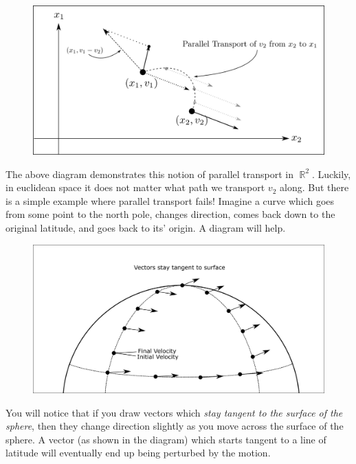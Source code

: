 \documentclass{article}
\DeclareMathOperator{\RR}{\mathbb{R}}
\begin{document}
\begin{figure}[ht]
    \centering
    \includegraphics[width=\linewidth]{Figures/figure3.png}
    \caption*{}
    \label{fig:21}
\end{figure}
The above diagram demonstrates this notion of parallel transport in $\RR^2$. Luckily, in euclidean space it does not matter what path we transport $v_2$ along. But there is a simple example where parallel transport fails! Imagine a curve which goes from some point to the north pole, changes direction, comes back down to the original latitude, and goes back to its' origin. A diagram will help.
\begin{figure}[h]
    \centering
    \includegraphics[width=\linewidth]{Figures/spheretransport.png}
    \caption*{}
    \label{fig:22}
\end{figure}

You will notice that if you draw vectors which \textit{stay tangent to the surface of the sphere}, then they change direction slightly as you move across the surface of the sphere. A vector (as shown in the diagram) which starts tangent to a line of latitude will eventually end up being perturbed by the motion.
\end{document}
